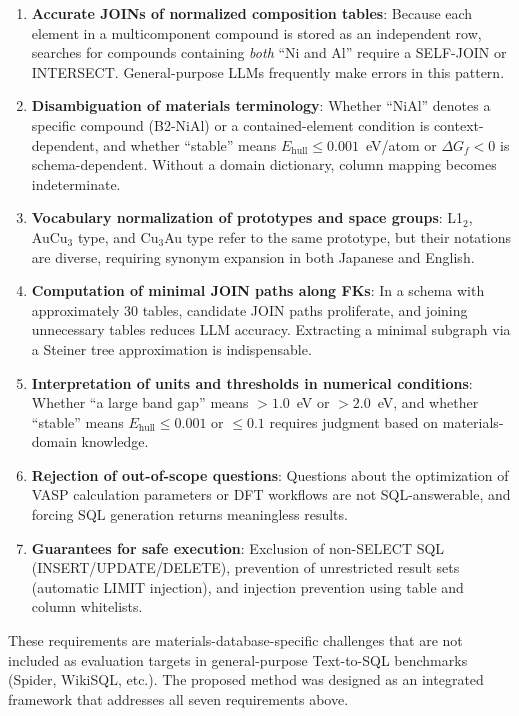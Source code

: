 \documentclass[5p,twocolumn]{elsarticle}
\begin{document}
\begin{enumerate}
  \item \textbf{Accurate JOINs of normalized composition tables}:
    Because each element in a multicomponent compound is stored as an independent row,
    searches for compounds containing \emph{both} ``Ni and Al'' require a SELF-JOIN or INTERSECT.
    General-purpose LLMs frequently make errors in this pattern.
  \item \textbf{Disambiguation of materials terminology}:
    Whether ``NiAl'' denotes a specific compound (B2-NiAl) or a contained-element condition is context-dependent,
    and whether ``stable'' means $E_\mathrm{hull} \leq 0.001$~eV/atom or
    $\Delta G_f < 0$ is schema-dependent.
    Without a domain dictionary, column mapping becomes indeterminate.
  \item \textbf{Vocabulary normalization of prototypes and space groups}:
    L1$_2$, AuCu$_3$ type, and Cu$_3$Au type refer to the same prototype,
    but their notations are diverse, requiring synonym expansion in both Japanese and English.
  \item \textbf{Computation of minimal JOIN paths along FKs}:
    In a schema with approximately 30 tables, candidate JOIN paths proliferate,
    and joining unnecessary tables reduces LLM accuracy.
    Extracting a minimal subgraph via a Steiner tree approximation is indispensable.
  \item \textbf{Interpretation of units and thresholds in numerical conditions}:
    Whether ``a large band gap'' means $> 1.0$~eV or $> 2.0$~eV,
    and whether ``stable'' means $E_\mathrm{hull} \leq 0.001$ or $\leq 0.1$
    requires judgment based on materials-domain knowledge.
  \item \textbf{Rejection of out-of-scope questions}:
    Questions about the optimization of VASP calculation parameters or DFT workflows are
    not SQL-answerable, and forcing SQL generation returns meaningless results.
  \item \textbf{Guarantees for safe execution}:
    Exclusion of non-SELECT SQL (INSERT/UPDATE/DELETE),
    prevention of unrestricted result sets (automatic LIMIT injection),
    and injection prevention using table and column whitelists.
\end{enumerate}

These requirements are materials-database-specific challenges that are
not included as evaluation targets in general-purpose Text-to-SQL benchmarks (Spider, WikiSQL, etc.).
The proposed method was designed as an integrated framework that addresses all seven requirements above.
\end{document}

